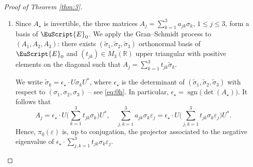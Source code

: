 \documentclass[JEP,XML,SOM,Unicode,NoFloatCountersInSection]{cedram}
\let\pazocal\EuScript
\theoremstyle{definition}
\DeclareMathOperator{\sgn}{sgn}
\DeclareMathOperator{\Tr}{Tr}
\newcommand{\EE}{\pazocal{E}}
\newcommand{\C}{\mathbb{C}}
\newcommand{\R}{\mathbb{R}}
\let\epsi\varepsilon
\let\p\partial
\newcommand{\tsigma}{{\tilde{\sigma}}}
\begin{document}
\begin{proof}[Proof of Theorem \ref{thm:3}]
\begin{enumerate}
For $\epsi \neq 0$, the matrix $\sum_{j, k=1}^3 a_{jk} \sigma_k \epsi_j$ has two opposite, distinct eigenvalues. Let $\pi_0(\epsi)$ be the projector to the negative eigenvalue. Then
\begin{align*}
\pi(\zeta_\star+\epsi) &= \pi_0(\epsi) + O(|\epsi|), & \nabla\pi(\zeta_\star+\epsi) &= \nabla\pi_0(\epsi) + O(1),
\\
\nabla\pi(\zeta_\star+\epsi) &= O(|\epsi|^{-1}), & \nabla\pi_0(\zeta_\star+\epsi) &= O(|\epsi|^{-1}).
\end{align*}
We refer to the proof of \cite[Lem.\,2.4]{D19b} for such estimates. It follows that
\begin{equation*}
	b(\zeta_\star+\epsi) = b_0(\epsi) + O(|\epsi|^{-1}), \quad \text{where} \ \ b_0(\epsi) = \Tr_{\C^N} \left( \pi_0(\epsi) \bigl[ \p_{\xi_1} \pi_0(\epsi), \p_{\xi_2} \pi_0(\epsi) \bigr]\right).
\end{equation*}
Grouping with \eqref{eq:0l}, we obtain $B_n(\zeta_\star+\epsi) = b_0(\epsi) + O(|\epsi|^{-1})$. In particular,
\begin{equation}\label{eq:0o}
\begin{split}
\int_{|\xi-\xi_\star| \leq r}\hspace*{-2mm} B_n(s_\star\pm\delta,\xi) d\xi &= \int_{|\xi-\xi_\star| \leq r}\hspace*{-2mm} b_0(\pm\delta,\xi-\xi_\star) d\xi + O\biggl(\int_{|\xi-\xi_\star| \leq r} \dfrac{1}{|\xi-\xi_\star|} d\xi\biggr)
\\
&= \int_{|\xi| \leq r} b_0(\pm\delta,\xi) d\xi + O(r).
\end{split}
\end{equation}

\item
Since $A_\star$ is invertible, the three matrices $A_j = \sum_{k=1}^3 a_{jk} \sigma_k$, $1 \leq j \leq 3$, form a basis of $\EE_0$. We apply the Gran--Schmidt process to $(A_1, A_2, A_3)$: there exists $(\tsigma_1,\tsigma_2,\tsigma_3)$ orthonormal basis of $\EE_0$ and $(t_{jk}) \in M_3(\R)$ upper triangular with positive elements on the diagonal such that $A_j = \sum_{k=1}^3 t_{jk} \tsigma_k$.

We write $\tsigma_k = \epsilon_\star \cdot U \sigma_k U^*$, where $\epsilon_\star$ is the determinant of $(\tsigma_1,\tsigma_2,\tsigma_3)$ with respect to $(\sigma_1,\sigma_2,\sigma_3)$ -- see \eqref{eq:0h}. In particular, $\epsilon_\star = \sgn\bigl( \det(A_\star)\bigr)$. It follows that
\begin{equation*}
A_j = \epsilon_\star \cdot U \biggl(\sum_{k=1}^3 t_{jk} \sigma_k\biggr) U^*, \quad \sum_{j, k=1}^3 a_{jk} \sigma_k \epsi_j = \epsilon_\star \cdot U \biggl(\sum_{j, k=1}^3 t_{jk} \sigma_k \epsi_j \biggr) U^*.
\end{equation*}
Hence, $\pi_0(\epsi)$ is, up to conjugation, the projector associated to the negative eigenvalue of $\epsilon_\star \cdot \sum_{j, k=1}^3 t_{jk} \sigma_k \epsi_j$.


\end{enumerate}
\end{proof}
\end{document}
